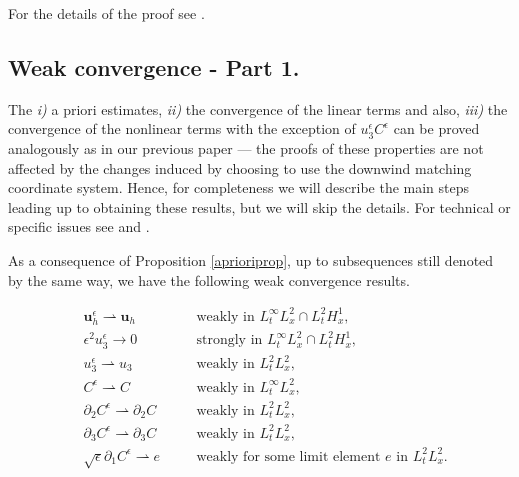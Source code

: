 \documentclass[11pt]{article}
\begin{document}
  For the details of the proof see \cite{pollatmws2019}.
  
    \subsection{Weak convergence - Part 1.}
  
  The \textit{i)} a priori estimates, \textit{ii)} the convergence of the linear terms and also, \textit{iii)} the convergence of the nonlinear terms with the exception of $u_3^\epsilon C^\epsilon$ can be proved analogously as in our previous paper --- the proofs of these properties are not affected by the changes induced by choosing to use the downwind matching coordinate system. Hence, for completeness we will describe the main steps leading up to obtaining these results, but we will skip the details. For technical or specific issues see \cite{azerad2001mathematical} and \cite{pollatmws2019}.
  
  As a consequence of Proposition \ref{aprioriprop}, up to subsequences still denoted by the same way, we have the following weak convergence results.
  
    \begin{align} 
    &  \mathbf{u}_h^\epsilon \rightharpoonup \mathbf{u}_h &\quad & \text{weakly in $L_t^\infty L_x^2 \cap L_t^2 H_x^1$,} \label{WeakConvUHEps} \\
    &  \epsilon^2 u_3^\epsilon \to 0 &\quad & \text{strongly in $L_t^\infty L_x^2 \cap L_t^2 H_x^1$,} \label{WeakConvU3Eps} \\ 
    & u_3^\epsilon \rightharpoonup u_3  &\quad & \text{weakly in $L_t^2 L_x^2$,} \label{WeakConvU3NoEps} \\
    & C^\epsilon \rightharpoonup C &\quad & \text{weakly in $L_t^\infty L_x^2$,} \label{WeakConvCEps1} \\
    & \partial_2 C^\epsilon \rightharpoonup \partial_2 C &\quad & \text{weakly in $L_t^2 L_x^2$,} \label{WeakConvCEps2} \\
    & \partial_3 C^\epsilon \rightharpoonup \partial_3 C &\quad & \text{weakly in $L_t^2 L_x^2$,} \label{WeakConvCEps3} \\
    & \sqrt{\epsilon} \partial_1 C^\epsilon \rightharpoonup e &\quad & \text{weakly for some limit element $e$ in $L_t^2 L_x^2$.} \label{WeakConvCEps4}
  \end{align} 
  
\end{document}
